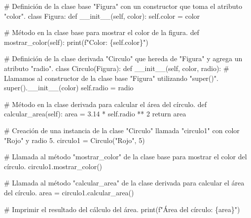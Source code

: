 \documentclass[
  a4paper,
  DIV=11,
  numbers=noendperiod,
  onepage,
  openany]{scrreprt}
\newenvironment{Shaded}{\begin{snugshade}}{\end{snugshade}}
\newcommand{\BuiltInTok}[1]{\textcolor[rgb]{0.00,0.23,0.31}{#1}}
\newcommand{\CommentTok}[1]{\textcolor[rgb]{0.37,0.37,0.37}{#1}}
\newcommand{\ControlFlowTok}[1]{\textcolor[rgb]{0.00,0.23,0.31}{#1}}
\newcommand{\DecValTok}[1]{\textcolor[rgb]{0.68,0.00,0.00}{#1}}
\newcommand{\FloatTok}[1]{\textcolor[rgb]{0.68,0.00,0.00}{#1}}
\newcommand{\FunctionTok}[1]{\textcolor[rgb]{0.28,0.35,0.67}{#1}}
\newcommand{\KeywordTok}[1]{\textcolor[rgb]{0.00,0.23,0.31}{#1}}
\newcommand{\NormalTok}[1]{\textcolor[rgb]{0.00,0.23,0.31}{#1}}
\newcommand{\OperatorTok}[1]{\textcolor[rgb]{0.37,0.37,0.37}{#1}}
\newcommand{\SpecialCharTok}[1]{\textcolor[rgb]{0.37,0.37,0.37}{#1}}
\newcommand{\SpecialStringTok}[1]{\textcolor[rgb]{0.13,0.47,0.30}{#1}}
\newcommand{\StringTok}[1]{\textcolor[rgb]{0.13,0.47,0.30}{#1}}
\newcommand{\VariableTok}[1]{\textcolor[rgb]{0.07,0.07,0.07}{#1}}
\begin{document}
\begin{Shaded}
\begin{Highlighting}[]
\CommentTok{\# Definición de la clase base "Figura" con un constructor que toma el atributo "color".}
\KeywordTok{class}\NormalTok{ Figura:}
    \KeywordTok{def} \FunctionTok{\_\_init\_\_}\NormalTok{(}\VariableTok{self}\NormalTok{, color):}
        \VariableTok{self}\NormalTok{.color }\OperatorTok{=}\NormalTok{ color}

    \CommentTok{\# Método en la clase base para mostrar el color de la figura.}
    \KeywordTok{def}\NormalTok{ mostrar\_color(}\VariableTok{self}\NormalTok{):}
        \BuiltInTok{print}\NormalTok{(}\SpecialStringTok{f"Color: }\SpecialCharTok{\{}\VariableTok{self}\SpecialCharTok{.}\NormalTok{color}\SpecialCharTok{\}}\SpecialStringTok{"}\NormalTok{)}

\CommentTok{\# Definición de la clase derivada "Circulo" que hereda de "Figura" y agrega un atributo "radio".}
\KeywordTok{class}\NormalTok{ Circulo(Figura):}
    \KeywordTok{def} \FunctionTok{\_\_init\_\_}\NormalTok{(}\VariableTok{self}\NormalTok{, color, radio):}
        \CommentTok{\# Llamamos al constructor de la clase base "Figura" utilizando "super()".}
        \BuiltInTok{super}\NormalTok{().}\FunctionTok{\_\_init\_\_}\NormalTok{(color)}
        \VariableTok{self}\NormalTok{.radio }\OperatorTok{=}\NormalTok{ radio}

    \CommentTok{\# Método en la clase derivada para calcular el área del círculo.}
    \KeywordTok{def}\NormalTok{ calcular\_area(}\VariableTok{self}\NormalTok{):}
\NormalTok{        area }\OperatorTok{=} \FloatTok{3.14} \OperatorTok{*} \VariableTok{self}\NormalTok{.radio }\OperatorTok{**} \DecValTok{2}
        \ControlFlowTok{return}\NormalTok{ area}

\CommentTok{\# Creación de una instancia de la clase "Circulo" llamada "circulo1" con color "Rojo" y radio 5.}
\NormalTok{circulo1 }\OperatorTok{=}\NormalTok{ Circulo(}\StringTok{"Rojo"}\NormalTok{, }\DecValTok{5}\NormalTok{)}

\CommentTok{\# Llamada al método "mostrar\_color" de la clase base para mostrar el color del círculo.}
\NormalTok{circulo1.mostrar\_color()}

\CommentTok{\# Llamada al método "calcular\_area" de la clase derivada para calcular el área del círculo.}
\NormalTok{area }\OperatorTok{=}\NormalTok{ circulo1.calcular\_area()}

\CommentTok{\# Imprimir el resultado del cálculo del área.}
\BuiltInTok{print}\NormalTok{(}\SpecialStringTok{f"Área del círculo: }\SpecialCharTok{\{}\NormalTok{area}\SpecialCharTok{\}}\SpecialStringTok{"}\NormalTok{)}
\end{Highlighting}
\end{Shaded}
\end{document}

